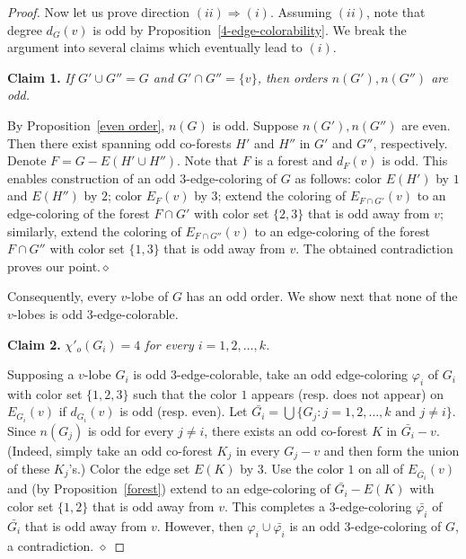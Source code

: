 \documentclass[a4paper,12pt]{article}
\numberwithin{equation}{section}
\begin{document}
\begin{proof}
\medskip

Now let us prove direction $(ii)\Rightarrow(i)$. Assuming $(ii)$, note that degree $d_G(v)$ is odd by Proposition~\ref{4-edge-colorability}. We break the argument into several claims  which eventually lead to $(i)$.

\bigskip

\noindent \textbf{Claim 1.} \textit{If $G'\cup G''=G$ and $G'\cap G''=\{v\}$, then orders $n(G'),n(G'')$ are odd.}

\medskip

\noindent By Proposition~\ref{even order}, $n(G)$ is odd. Suppose $n(G'),n(G'')$ are even. Then there exist spanning odd co-forests $H'$ and $H''$ in $G'$ and $G''$, respectively. Denote $F=G-E(H'\cup H'')$. Note that $F$ is a forest and $d_F(v)$ is odd. This enables construction of an odd $3$-edge-coloring of $G$ as follows: color $E(H')$ by $1$ and $E(H'')$ by $2$; color $E_F(v)$ by $3$; extend the coloring of $E_{F\cap G'}(v)$ to an edge-coloring of the forest $F\cap G'$ with color set $\{2,3\}$ that is odd away from $v$; similarly, extend the coloring of $E_{F\cap G''}(v)$ to an edge-coloring of the forest $F\cap G''$ with color set $\{1,3\}$ that is odd away from $v$. The obtained contradiction proves our point.\hfill$\diamond$

\bigskip

Consequently, every $v$-lobe of $G$ has an odd order. We show next that none of the $v$-lobes is odd $3$-edge-colorable.

\bigskip

\noindent \textbf{Claim 2.} \textit{$\chi'_o(G_i)=4$ for every $i=1,2,\ldots,k$.}

\medskip

\noindent Supposing a $v$-lobe $G_i$ is odd $3$-edge-colorable, take an odd edge-coloring $\varphi_i$ of $G_i$ with color set $\{1,2,3\}$ such that the color $1$ appears (resp. does not appear) on $E_{G_i}(v)$ if $d_{G_i}(v)$ is odd (resp. even). Let $\bar{G_i}=\bigcup\{G_j:j=1,2,\ldots,k \text { and } j\neq i\}$. Since $n(G_j)$ is odd for every $j\neq i$, there exists an odd co-forest $K$ in $\bar{G_i}-v$. (Indeed, simply take an odd co-forest $K_j$ in every $G_j-v$ and then form the union of these $K_j$'s.) Color the edge set $E(K)$ by $3$. Use the color $1$ on all of $E_{\bar{G_i}}(v)$ and (by Proposition~\ref{forest}) extend to an edge-coloring of $\bar{G_i}-E(K)$ with color set $\{1,2\}$ that is odd away from $v$. This completes a $3$-edge-coloring $\bar{\varphi_i}$ of $\bar{G_i}$ that is odd away from $v$. However, then $\varphi_i\cup\bar{\varphi_i}$ is an odd $3$-edge-coloring of $G$, a contradiction.
\hfill$\diamond$


\end{proof}
\end{document}
